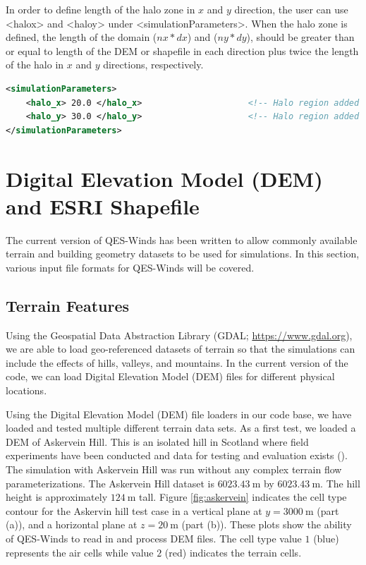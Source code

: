 In order to define length of the halo zone in $x$ and $y$ direction, the user can use <halo\textunderscore x> and <halo\textunderscore y> under <simulationParameters>. When the halo zone is defined, the length of the domain ($nx*dx$) and ($ny*dy$), should be greater than or equal to length of the DEM or shapefile in each direction plus twice the length of the halo in $x$ and $y$ directions, respectively.

\begin{lstlisting}[language=XML]
<simulationParameters>
  	<halo_x> 20.0 </halo_x>						<!-- Halo region added to x-direction of domain (at the beginning and the end of domain) (meters)-->
  	<halo_y> 30.0 </halo_y>						<!-- Halo region added to y-direction of domain (at the beginning and the end of domain) (meters)-->
</simulationParameters>
\end{lstlisting}

\section{Digital Elevation Model (DEM) and ESRI Shapefile}

The current version of QES-Winds has been written to allow commonly available terrain and building geometry datasets to be used for simulations. In this section, various input file formats for QES-Winds will be covered.

\subsection{Terrain Features}

Using the Geospatial Data Abstraction Library (GDAL; \href{https://www.gdal.org}{https://www.gdal.org}), we are able to load geo-referenced datasets of terrain so that the simulations can include the effects of hills, valleys, and mountains. In the current version of the code, we can load Digital Elevation Model (DEM) files for different physical locations.

Using the Digital Elevation Model (DEM) file loaders in our code base, we have loaded and tested multiple different terrain data sets. As a first test, we loaded a DEM of Askervein Hill. This is an isolated hill in Scotland where field experiments have been conducted and data for testing and evaluation exists (\cite{taylor1987askervein,mickle1988askervein}). The simulation with Askervein Hill was run without any complex terrain flow parameterizations. The Askervein Hill dataset is $6023.43\ \si{\metre}$ by $6023.43\ \si{\metre}$. The hill height is approximately $124\ \si{\metre}$ tall. Figure \ref{fig:askervein} indicates the cell type contour for the Askervin hill test case in a vertical plane at $y = 3000\ \si{\metre}$ (part (a)), and a horizontal plane at $z=20\ \si{\metre}$ (part (b)). These plots show the ability of QES-Winds to read in and process DEM files. The cell type value $1$ (blue) represents the air cells while value $2$ (red) indicates the terrain cells.


